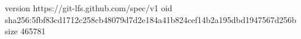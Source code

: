version https://git-lfs.github.com/spec/v1
oid sha256:5fbf83cd1712c258cb48079d7d2e184a41b824cef14b2a195dbd1947567d256b
size 465781

